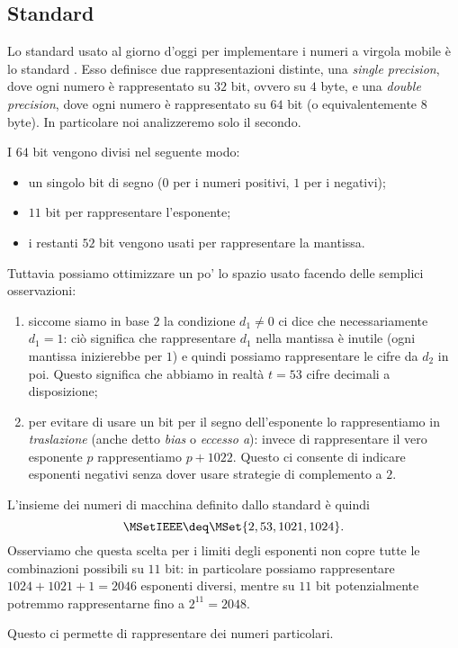 \subsection{Standard \IEEE}

Lo standard usato al giorno d'oggi per implementare i numeri a virgola mobile è lo standard \IEEE. 
Esso definisce due rappresentazioni distinte, una \emph{single precision}, dove ogni numero è rappresentato su $32$ bit, ovvero su $4$ byte, e una \emph{double precision}, dove ogni numero è rappresentato su $64$ bit (o equivalentemente $8$ byte). 
In particolare noi analizzeremo solo il secondo.

I $64$ bit vengono divisi nel seguente modo:
\begin{itemize}
    \item un singolo bit di segno ($0$ per i numeri positivi, $1$ per i negativi);
    \item $11$ bit per rappresentare l'esponente;
    \item i restanti $52$ bit vengono usati per rappresentare la mantissa.
\end{itemize} Tuttavia possiamo ottimizzare un po' lo spazio usato facendo delle semplici osservazioni:
\begin{enumerate}
    \item siccome siamo in base $2$ la condizione $d_1 \neq 0$ ci dice che necessariamente $d_1 = 1$: ciò significa che rappresentare $d_1$ nella mantissa è inutile (ogni mantissa inizierebbe per $1$) e quindi possiamo rappresentare le cifre da $d_2$ in poi. Questo significa che abbiamo in realtà $t = 53$ cifre decimali a disposizione;
    \item per evitare di usare un bit per il segno dell'esponente lo rappresentiamo in \emph{traslazione} (anche detto \emph{bias} o \emph{eccesso a}): invece di rappresentare il vero esponente $p$ rappresentiamo $p+1022$. Questo ci consente di indicare esponenti negativi senza dover usare strategie di complemento a $2$.  
\end{enumerate}

L'insieme dei numeri di macchina definito dallo standard \IEEE è quindi \[
    \MSetIEEE \deq \MSet{2, 53, 1021, 1024}.
\] 
Osserviamo che questa scelta per i limiti degli esponenti non copre tutte le combinazioni possibili su $11$ bit: in particolare possiamo rappresentare $1024 + 1021 + 1 = 2046$ esponenti diversi, mentre su $11$ bit potenzialmente potremmo rappresentarne fino a $2^{11} = 2048$.

Questo ci permette di rappresentare dei numeri particolari.

